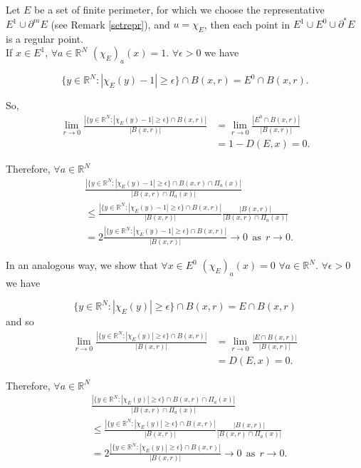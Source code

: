 \begin{example} \label{regpointchar} Let $E$ be a set of finite perimeter, for which we choose the representative $E^{1} \cup \partial^{m} E$ (see Remark \ref{setrepr}), and $u = \chi_{E}$, then each point in $E^{1} \cup E^{0} \cup \partial^{*}E$ is a regular point. 
\\
If $x \in E^{1}$, $\forall a \in \mathbb{R}^{N}$ $(\chi_{E})_{a}(x) = 1$.
$\forall \epsilon > 0$ we have

\[ \{y \in \mathbb{R}^{N} : |\chi_{E}(y) - 1| \ge \epsilon \} \cap B(x,r) = E^{0} \cap B(x, r) . \]

So, 
\begin{align*} \lim_{r \to 0} \frac{|\{y \in \mathbb{R}^{N} : |\chi_{E}(y) - 1| \ge \epsilon \} \cap B(x,r)|}{|B(x, r)|} &= \lim_{r \to 0} \frac{|E^{0} \cap B(x, r)|}{|B(x, r)|} \\
&= 1 - D(E, x)  = 0. 
\end{align*}

Therefore, $\forall a \in \mathbb{R}^{N}$
\begin{align*} & \frac{ |\{y \in \mathbb{R}^{N} : |\chi_{E}(y) - 1| \ge \epsilon \} \cap B(x, r) \cap \Pi_{a}(x)|}{|B(x, r) \cap \Pi_{a}(x)|} \\
& \le \frac{|\{y \in \mathbb{R}^{N} : |\chi_{E}(y) - 1| \ge \epsilon \} \cap B(x, r)|}{|B(x, r)|} \frac{|B(x, r)|}{|B(x, r) \cap \Pi_{a}(x)|} \\
& = 2 \frac{|\{y \in \mathbb{R}^{N} : |\chi_{E}(y) - 1| \ge \epsilon \} \cap B(x, r)|}{|B(x, r)|} \to 0 \ \ \text{as} \ \ r \to 0.
\end{align*}

In an analogous way, we show that $\forall x \in E^{0}$ $(\chi_{E})_{a}(x) = 0$ $\forall a \in \mathbb{R}^{N}$. $\forall \epsilon > 0$ we have

\[ \{y \in \mathbb{R}^{N} : |\chi_{E}(y)| \ge \epsilon \} \cap B(x,r) = E \cap B(x, r)  \]
and so
\begin{align*} \lim_{r \to 0} \frac{|\{y \in \mathbb{R}^{N} : |\chi_{E}(y)| \ge \epsilon \} \cap B(x,r)|}{|B(x, r)|} &= \lim_{r \to 0} \frac{|E \cap B(x, r)|}{|B(x, r)|} \\
&= D(E, x)  = 0. 
\end{align*}

Therefore, $\forall a \in \mathbb{R}^{N}$
\begin{align*} & \frac{ |\{y \in \mathbb{R}^{N} : |\chi_{E}(y)| \ge \epsilon \}\cap B(x, r) \cap \Pi_{a}(x)|}{|B(x, r) \cap \Pi_{a}(x)|} \\
& \le \frac{|\{y \in \mathbb{R}^{N} : |\chi_{E}(y)| \ge \epsilon \} \cap B(x, r)|}{|B(x, r)|} \frac{|B(x, r)|}{|B(x, r) \cap \Pi_{a}(x)|} \\
& = 2 \frac{|\{y \in \mathbb{R}^{N} : |\chi_{E}(y)| \ge \epsilon \} \cap B(x, r)|}{|B(x, r)|} \to 0 \ \ \text{as} \ \ r \to 0.
\end{align*}


\end{example}
